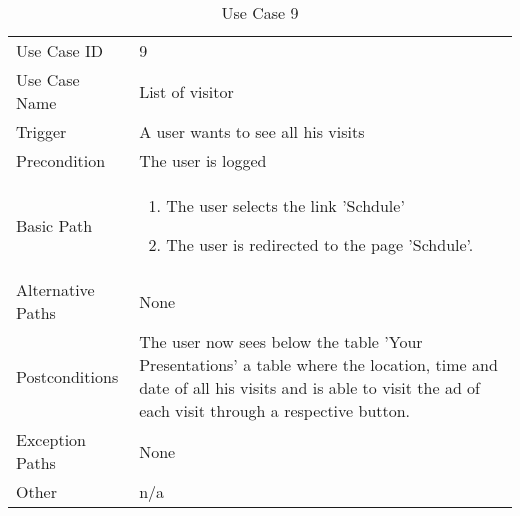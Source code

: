 \begin{table}[H]
\centering
\label{table-use-case-9}
\begin{tabular}{|p{3cm}|p{10cm}}
Use Case ID       & 9                                                        \\
Use Case Name     & List of visitor                          \\
Trigger           & A user wants to see all his visits\\
Precondition      & The user is logged             \\
Basic Path        & \begin{enumerate}
\item The user selects the link 'Schdule' 
\item The user is redirected to the page 'Schdule'. 
\end{enumerate} 
     \\
Alternative Paths & None                          \\
Postconditions    & The user now sees below the table 'Your Presentations' a
table where the location, time and date of all his visits and is able to visit
the ad of each visit through a respective button.
\\
Exception Paths   & None			\\
Other             & n/a                                                                                                                                                                                                        
\end{tabular}
\caption{Use Case 9}
\end{table}

